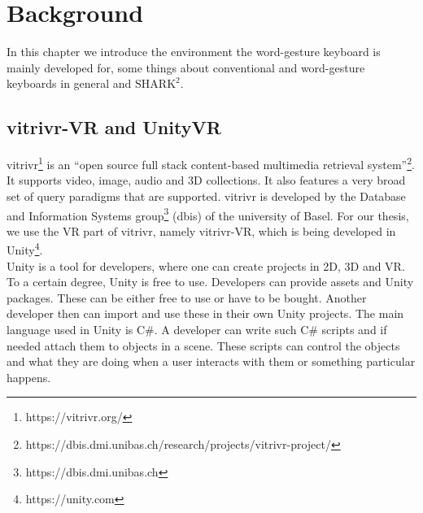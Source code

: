 \chapter{Background}

In this chapter we introduce the environment the word-gesture keyboard is mainly developed for, some things about conventional and word-gesture keyboards in general and $\text{SHARK}^2$.

\section{vitrivr-VR and UnityVR}
vitrivr\footnote{https://vitrivr.org/} is an ``open source full stack content-based multimedia retrieval system''\footnote{https://dbis.dmi.unibas.ch/research/projects/vitrivr-project/}. It supports video, image, audio and 3D collections. It also features a very broad set of query paradigms that are supported. vitrivr is developed by the Database and Information Systems group\footnote{https://dbis.dmi.unibas.ch} (dbis) of the university of Basel. For our thesis, we use the VR part of vitrivr, namely vitrivr-VR, which is being developed in Unity\footnote{https://unity.com}.\\
Unity is a tool for developers, where one can create projects in 2D, 3D and VR. To a certain degree, Unity is free to use. Developers can provide assets and Unity packages. These can be either free to use or have to be bought. Another developer then can import and use these in their own Unity projects. The main language used in Unity is C\#. A developer can write such C\# scripts and if needed attach them to objects in a scene. These scripts can control the objects and what they are doing when a user interacts with them or something particular happens. 

